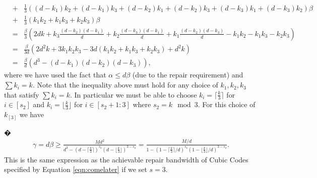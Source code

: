 \documentclass[journal,onecolumn,draftcls]{IEEEtran}
\begin{document}
\begin{IEEEproof}
\begin{eqnarray*}
&+& \frac{1}{3}\left((d-k_1)k_2 +(d-k_1)k_3 +(d-k_2)k_1 +(d-k_2)k_3 +(d-k_3)k_1 +(d-k_3)k_2\right)\beta\nonumber\\
&+&\frac{1}{3}(k_1k_2 + k_1k_3+ k_2k_3)\beta\nonumber\\
&=& \frac{\beta}{3}(2dk +  k_3\frac{(d-k_2)(d-k_1)}{d}  + k_2\frac{(d-k_3)(d-k_1)}{d} + k_1\frac{(d-k_2)(d-k_3)}{d}-k_1k_2-k_1k_3-k_2k_3)\\
&=& \frac{\beta}{3d}(2d^2k  + 3k_1k_2k_3 -3d(k_1k_2 + k_1k_3 + k_2k_3) + d^2k)\\
&=& \frac{\beta}{d}(d^3 - (d-k_1)(d-k_2)(d-k_3)),
\label{eqn:ineq16}
\end{eqnarray*}
where we have used the fact that $\alpha \le {d\beta}$ (due to the repair requirement) and $\sum{k_i} = k$. Note that the inequality above must hold for any choice of $k_1,k_2,k_3$ that satisfy $\sum{k_i} = k$. In particular we must be able to choose $k_i = \lceil\frac{k}{3}\rceil$ for $i\in[s_2]$ and $k_i = \lfloor\frac{k}{3}\rfloor$ for $i\in[s_2+1:3]$ where $s_2 =k\mod 3$. For this choice of $k_{[3]}$ we have

�\begin{eqnarray*}
\gamma = d\beta \ge \frac{Md^2}{d^3 - (d-\lceil\frac{k}{3}\rceil)^{s_2} (d-\lfloor\frac{k}{3}\rfloor)^{3-s_2}} = \frac{M/d}{1 - (1-\lceil\frac{k}{3}\rceil/d)^{s_2} (1-\lfloor\frac{k}{3}\rfloor/d)^{3-s_2}}. 
\end{eqnarray*}
This is the same expression as the achievable repair bandwidth of Cubic Codes specified by Equation \eqref{eqn:comelater} if we set $s = 3$.
\end{IEEEproof}
\end{document}
